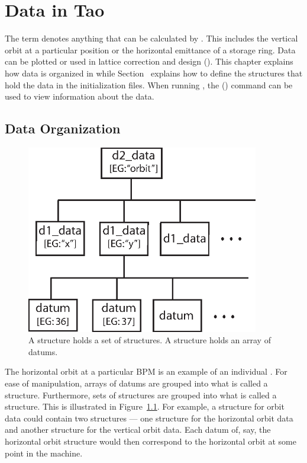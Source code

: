 \chapter{Data in Tao}
\label{c:data}

The term  denotes anything that can be calculated by
\tao. This includes the vertical orbit at a particular position or the
horizontal emittance of a storage ring. Data can be plotted or used in
lattice correction and design (). This chapter explains
how data is organized in \tao while Section~
explains how to define the structures that hold the data in the
initialization files. When running \tao, the 
() command can be used to view information about the
data.


\section{Data Organization}
\label{s:data.org}

\begin{figure}
  \centering
  \includegraphics[width=4in]{data-tree.eps}
  \caption[Data tree structure]
{A  structure holds a set of  structures. 
A  structure holds an array of datums.}
  \label{f:data.tree}
\end{figure}

The horizontal orbit at a particular BPM is an example of an
individual .  For ease of manipulation, arrays of datums are
grouped into what is called a  structure. Furthermore,
sets of  structures are grouped into what is called a
 structure.  This is illustrated in
Figure~\ref{f:data.tree}.  For example, a  structure for
orbit data could contain two  structures --- one
 structure for the horizontal orbit data and another
 structure for the vertical orbit data. Each datum of,
say, the horizontal orbit  structure would then correspond
to the horizontal orbit at some point in the machine.

